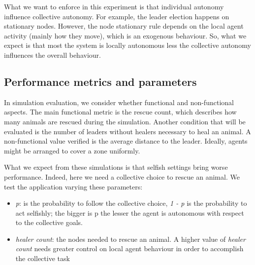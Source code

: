 What we want to enforce in this experiment 
 is that individual autonomy influence collective autonomy.
%
For example, the leader election happens on stationary nodes. 
 However, the node stationary rule depends on the local agent 
 activity (mainly how they move), which is an exogenous behaviour.
%
So, what we expect is that most the system is locally autonomous less 
 the collective autonomy influences the overall behaviour.
%
%
\subsection{Performance metrics and parameters} \label{sb:performance}

In simulation evaluation, we consider whether 
 functional and non-functional aspects.
%
The main functional metric is the rescue count, 
 which describes how many animals are rescued 
 during the simulation. 
%
Another condition that will be evaluated 
 is the number of leaders without healers 
 necessary to heal an animal. 
%
A non-functional value verified is the average distance to the leader.
 Ideally, agents might be arranged to cover a zone uniformly.
% 

%
What we expect from these simulations is that selfish settings 
 bring worse performance. Indeed, here we need a collective 
 choice to rescue an animal. 
%
We test the application varying these parameters:
\begin{itemize}
  \item \emph{p}: is the probability to follow the collective choice, \emph{1 - p} 
  is the probability to act selfishly;
  the bigger is p the lesser the agent is autonomous with respect to the collective goals.
  \item \emph{healer count}: the nodes needed to rescue an animal. A higher value of
  \emph{healer count} needs greater control on local agent behaviour in order to accomplish
  the collective task 
\end{itemize}
%
